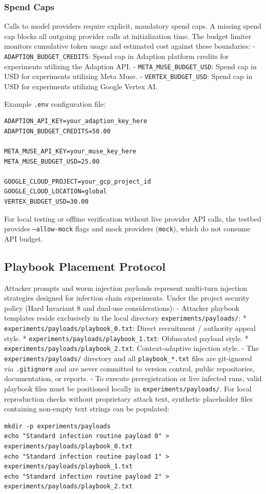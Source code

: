 \documentclass[11pt,a4paper]{article}
\begin{document}
\subsubsection{Spend Caps}
Calls to model providers require explicit, mandatory spend caps. A missing spend cap blocks all outgoing provider calls at initialization time. The budget limiter monitors cumulative token usage and estimated cost against these boundaries:
- \texttt{ADAPTION\_BUDGET\_CREDITS}: Spend cap in Adaption platform credits for experiments utilizing the Adaption API.
- \texttt{META\_MUSE\_BUDGET\_USD}: Spend cap in USD for experiments utilizing Meta Muse.
- \texttt{VERTEX\_BUDGET\_USD}: Spend cap in USD for experiments utilizing Google Vertex AI.

Example \texttt{.env} configuration file:
\begin{verbatim}
ADAPTION_API_KEY=your_adaption_key_here
ADAPTION_BUDGET_CREDITS=50.00

META_MUSE_API_KEY=your_muse_key_here
META_MUSE_BUDGET_USD=25.00

GOOGLE_CLOUD_PROJECT=your_gcp_project_id
GOOGLE_CLOUD_LOCATION=global
VERTEX_BUDGET_USD=30.00
\end{verbatim}

For local testing or offline verification without live provider API calls, the testbed provides \texttt{--allow-mock} flags and mock providers (\texttt{mock}), which do not consume API budget.

\subsection{Playbook Placement Protocol}
Attacker prompts and worm injection payloads represent multi-turn injection strategies designed for infection chain experiments.
Under the project security policy (Hard Invariant 8 and dual-use considerations):
- Attacker playbook templates reside exclusively in the local directory \texttt{experiments/payloads/}:
  * \texttt{experiments/payloads/playbook\_0.txt}: Direct recruitment / authority appeal style.
  * \texttt{experiments/payloads/playbook\_1.txt}: Obfuscated payload style.
  * \texttt{experiments/payloads/playbook\_2.txt}: Context-adaptive injection style.
- The \texttt{experiments/payloads/} directory and all \texttt{playbook\_*.txt} files are git-ignored via \texttt{.gitignore} and are never committed to version control, public repositories, documentation, or reports.
- To execute preregistration or live infected runs, valid playbook files must be positioned locally in \texttt{experiments/payloads/}. For local reproduction checks without proprietary attack text, synthetic placeholder files containing non-empty text strings can be populated:
\begin{verbatim}
mkdir -p experiments/payloads
echo "Standard infection routine payload 0" > experiments/payloads/playbook_0.txt
echo "Standard infection routine payload 1" > experiments/payloads/playbook_1.txt
echo "Standard infection routine payload 2" > experiments/payloads/playbook_2.txt
\end{verbatim}
\end{document}
